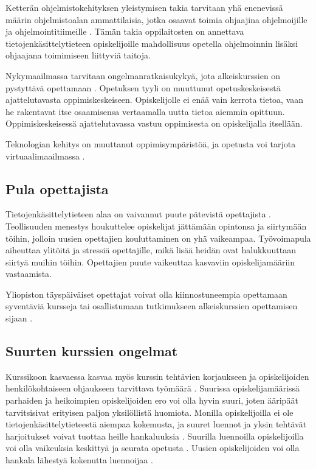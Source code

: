 \documentclass[finnish]{tktltiki2}
\theoremstyle{definition}
\theoremstyle{remark}
\begin{document}
Ketterän ohjelmistokehityksen yleistymisen takia tarvitaan yhä enenevissä määrin ohjelmistoalan ammattilaisia, jotka osaavat toimia ohjaajina ohjelmoijille ja ohjelmointitiimeille \cite{Vikberg}. Tämän takia oppilaitosten on annettava tietojenkäsittelytieteen opiskelijoille mahdollisuus opetella ohjelmoinnin lisäksi ohjaajana toimimiseen liittyviä taitoja. \par

Nykymaailmassa tarvitaan ongelmanratkaisukykyä, jota alkeiskurssien on pystyttävä opettamaan \cite{Yadin11}. Opetuksen tyyli on muuttunut opetuskeskeisestä ajattelutavasta oppimiskeskeiseen. Opiskelijolle ei enää vain kerrota tietoa, vaan he rakentavat itse osaamisensa vertaamalla uutta tietoa aiemmin opittuun. Oppimiskeskeisessä ajattelutavassa vastuu oppimisesta on opiskelijalla itsellään. \par

Teknologian kehitys on muuttanut oppimisympäristöä, ja opetusta voi tarjota virtuaalimaailmassa \cite{Yadin11}. \par

\subsection{Pula opettajista}
Tietojenkäsittelytieteen alaa on vaivannut puute pätevistä opettajista \cite{Roberts99}. Teollisuuden menestys houkuttelee opiskelijat jättämään opintonsa ja siirtymään töihin, jolloin uusien opettajien kouluttaminen on yhä vaikeampaa. Työ\-voi\-ma\-pu\-la aiheuttaa ylitöitä ja stressiä opettajille, mikä lisää heidän ovat halukkuuttaan siirtyä muihin töihin. Opettajien puute vaikeuttaa kasvaviin opiskelijamääriin vastaamista.  \par

Yliopiston täyspäiväiset opettajat voivat olla kiinnostuneempia opettamaan syventäviä kursseja tai osallistumaan tutkimukseen alkeiskurssien opettamisen sijaan \cite{Shannon98}. \par



\subsection{Suurten kurssien ongelmat}

Kurssikoon kasvaessa kasvaa myös kurssin tehtävien korjaukseen ja opiskelijoiden henkilökohtaiseen ohjaukseen tarvittava työmäärä \cite{Kay98}. Suurissa opiskelijamäärissä parhaiden ja heikoimpien opiskelijoiden ero voi olla hyvin suuri, joten ääripäät tarvitsisivat erityisen paljon yksilöllistä huomiota. Monilla opiskelijoilla ei ole tietojenkäsittelytieteestä aiempaa kokemusta, ja suuret luennot ja yksin tehtävät harjoitukset voivat tuottaa heille hankaluuksia \cite{Murphy11}. Suurilla luennoilla opiskelijoilla voi olla vaikeuksia keskittyä ja seurata opetusta \cite{Boyer07}. Uusien opiskelijoiden voi olla hankala lähestyä kokenutta luennoijaa \cite{Kopp00}. \par
\end{document}
